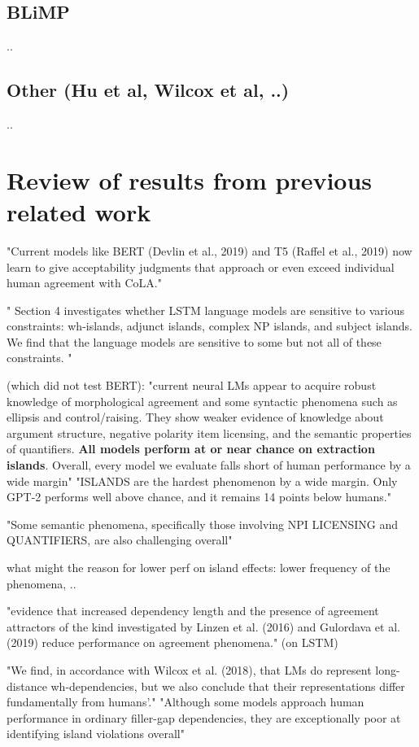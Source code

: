 \subsection{BLiMP}
..
\subsection{Other (Hu et al, Wilcox et al, ..)}
..


\section{Review of results from previous related work}

"Current models like BERT (Devlin et al., 2019) and T5 (Raffel et al., 2019) now learn to give acceptability judgments that approach or even exceed individual human agreement with CoLA." \citep{warstadt2020blimp}	

" Section 4 investigates whether
LSTM language models are sensitive to various
constraints: wh-islands, adjunct islands, complex
NP islands, and subject islands. We find that the
language models are sensitive to some but not all
of these constraints. " \citep{wilcox2018rnn}

\citet{warstadt2020blimp} (which did not test BERT): "current neural LMs appear to acquire robust
knowledge of morphological agreement and some syntactic phenomena such as ellipsis and control/raising. They show weaker evidence of knowledge about argument structure, negative polarity item licensing, and the semantic properties of quantifiers. \textbf{All models perform at or near chance on extraction islands}. Overall, every model we evaluate falls short of human performance by a wide margin"
"ISLANDS are the hardest phenomenon by a wide margin. Only GPT-2 performs well above
chance, and it remains 14 points below humans." \citet{warstadt2020blimp}

"Some semantic phenomena, specifically those involving NPI LICENSING and QUANTIFIERS, are also challenging overall"

what might the reason for lower perf on island effects: lower frequency of the phenomena, ..

"evidence that increased dependency length and the presence of agreement attractors of the kind investigated by Linzen et al. (2016) and Gulordava et al. (2019) reduce performance on agreement phenomena." (on LSTM) \citet{warstadt2020blimp}

"We find, in accordance with Wilcox et al.
(2018), that LMs do represent long-distance
wh-dependencies, but we also conclude that
their representations differ fundamentally from humans’." \citet{warstadt2020blimp}
"Although some models approach human
performance in ordinary filler-gap dependencies,
they are exceptionally poor at identifying island
violations overall" \citet{warstadt2020blimp}

